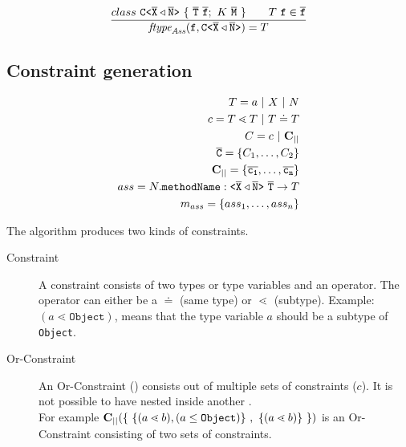 \documentclass[a4paper,USenglish,cleveref, autoref, thm-restate]{lipics-v2021}
\begin{document}
\begin{enumerate}
\begin{align*}
  \frac{\displaystyle 
    class\ \mathtt{C \texttt{<} \overline{\tt X} \triangleleft \overline{\tt N} \texttt{>} }\ \{\ \overline{\tt T}\ \overline{\tt f};\ K\ \overline{\tt M}\ \} \quad \quad
    T\ \texttt{f} \in \overline{\tt f}
  }{\displaystyle 
    \textit{ftype}_\textit{Ass}(\texttt{f}, \mathtt{C \texttt{<} \overline{\tt X} \triangleleft \overline{\tt N} \texttt{>} }) = T
  }
\end{align*}
\end{enumerate}


\subsection{Constraint generation}
\label{sec:fjtype}


\begin{align*}
T = a\ |\ X\ |\ N \\
c = T \lessdot T \ |\ T \doteq T \\
C = c\ |\ \textbf{C}_{||} \\
\overline{\mathtt{C}} = \{ C_1, \ldots, C_2 \} \\
\textbf{C}_{||}{} = \{ \overline{\tt c_1}, \ldots, \overline{\tt c_n} \} \\
ass = N.\texttt{methodName} : \mathtt{ \texttt{<} \overline{\tt X} \triangleleft \overline{\tt N} \texttt{>} }\ \overline{\tt T} \to T \\
m_{ass} = \{  ass_1, \ldots , ass_n  \} \\
\end{align*}

The \fjtype algorithm produces two kinds of constraints.
\begin{description}
\item[Constraint] A constraint consists of two types or type variables and an operator.
The operator can either be a $\doteq$ (same type) or $\lessdot$ (subtype).
Example: $(a \lessdot \mathtt{Object})$, means that the type variable $a$ should be a subtype of \texttt{Object}.
\item[Or-Constraint] An Or-Constraint (\orCons{}) consists out of multiple sets of constraints ($c$).
It is not possible to have \orCons{} nested inside another \orCons{}.\\
For example $\textbf{C}_{||}{}(\{ \ \{ (a \lessdot b), (a \leq \mathtt{Object}) \} \ , \ \{ (a \lessdot b)\} \ \})$
is an Or-Constraint consisting of two sets of constraints.
\end{description}
\end{document}
